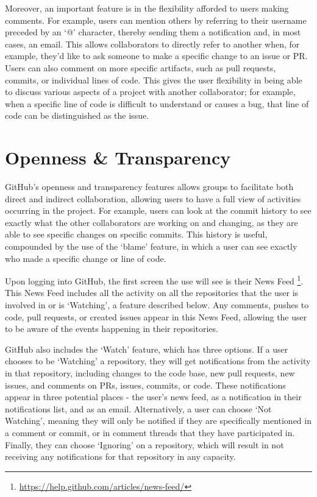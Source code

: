 Moreover, an important feature is in the flexibility afforded to users making comments. For example, users can mention others by referring to their username preceded by an `@' character, thereby sending them a notification and, in most cases, an email. This allows collaborators to directly refer to another when, for example, they'd like to ask someone to make a specific change to an issue or PR. Users can also comment on more specific artifacts, such as pull requests, commits, or individual lines of code. This gives the user flexibility in being able to discuss various aspects of a project with another collaborator; for example, when a specific line of code is difficult to understand or causes a bug, that line of code can be distinguished as the issue.

\section{Openness \& Transparency}
GitHub's openness and transparency features allows groups to facilitate both direct and indirect collaboration, allowing users to have a full view of activities occurring in the project. For example, users can look at the commit history to see exactly what the other collaborators are working on and changing, as they are able to see specific changes on specific commits. This history is useful, compounded by the use of the `blame' feature, in which a user can see exactly who made a specific change or line of code. %

Upon logging into GitHub, the first screen the use will see is their News Feed \footnote{\url{https://help.github.com/articles/news-feed/}}. This News Feed includes all the activity on all the repositories that the user is involved in or is `Watching', a feature described below. Any comments, pushes to code, pull requests, or created issues appear in this News Feed, allowing the user to be aware of the events happening in their repositories.

GitHub also includes the `Watch' feature, which has three options. If a user chooses to be `Watching' a repository, they will get notifications from the activity in that repository, including changes to the code base, new pull requests, new issues, and comments on PRs, issues, commits, or code. These notifications appear in three potential places - the user's news feed, as a notification in their notifications list, and as an email. Alternatively, a user can choose `Not Watching', meaning they will only be notified if they are specifically mentioned in a comment or commit, or in comment threads that they have participated in. Finally, they can choose `Ignoring' on a repository, which will result in not receiving any notifications for that repository in any capacity.

